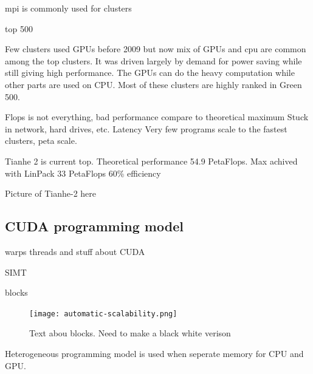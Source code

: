 \documentclass[10pt,a4paper]{report}
\begin{document}
mpi is commonly used for clusters\cite{kirk2012programming}

top 500\cite{TOP500}

Few clusters used GPUs before 2009 but now mix of GPUs and cpu are common among the top clusters. It was driven largely by demand for power saving while still giving high performance. The GPUs can do the heavy computation while other parts are used on CPU. Most of these clusters are highly ranked in Green 500. \cite{kirk2012programming}

Flops is not everything, bad performance compare to theoretical maximum
Stuck in network, hard drives, etc. Latency
Very few programs scale to the fastest clusters, peta scale.

Tianhe 2 is current top. Theoretical performance 54.9 PetaFlops.\cite{TOP500}
Max achived with LinPack 33 PetaFlops
60\% efficiency

Picture of Tianhe-2 here

\subsection{CUDA programming model}
warps threads and stuff about CUDA\cite{cuda}

SIMT

blocks

\begin{figure}[h]
    \centering
    \texttt{[image: automatic-scalability.png]}
    \caption{Text abou blocks. Need to make a black white verison}
    \label{fig:blocks_scaling}
\end{figure}

Heterogeneous programming model is used when seperate memory for CPU and GPU.
\end{document}

